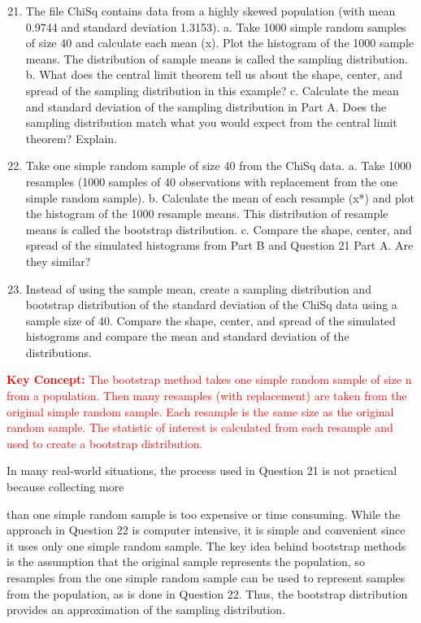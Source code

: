 \documentclass[
]{report}
\theoremstyle{definition}
\theoremstyle{definition}
\theoremstyle{definition}
\theoremstyle{definition}
\theoremstyle{remark}
\begin{document}
\begin{enumerate}
  \setcounter{enumi}{20} 
\item The file ChiSq contains data from a highly skewed population (with mean 0.9744 and standard
deviation 1.3153).
a. Take 1000 simple random samples of size 40 and calculate each mean (x). Plot the histogram of the
1000 sample means. The distribution of sample means is called the sampling distribution.
b. What does the central limit theorem tell us about the shape, center, and spread of the sampling distribution
in this example?
c. Calculate the mean and standard deviation of the sampling distribution in Part A. Does the sampling
distribution match what you would expect from the central limit theorem? Explain.
\item Take one simple random sample of size 40 from the ChiSq data.
a. Take 1000 resamples (1000 samples of 40 observations with replacement from the one simple
random sample).
b. Calculate the mean of each resample (x*) and plot the histogram of the 1000 resample means. This
distribution of resample means is called the bootstrap distribution.
c. Compare the shape, center, and spread of the simulated histograms from Part B and Question
21 Part A. Are they similar?
\item Instead of using the sample mean, create a sampling distribution and bootstrap distribution of the standard
deviation of the ChiSq data using a sample size of 40. Compare the shape, center, and spread of
the simulated histograms and compare the mean and standard deviation of the distributions.
\end{enumerate}

\Large

\textbf{\textcolor{red}{Key Concept:}}
\textcolor{red}{The bootstrap method takes one simple random sample of size n from a population. Then many resamples
(with replacement) are taken from the original simple random sample. Each resample is the same
size as the original random sample. The statistic of interest is calculated from each resample and used
to create a bootstrap distribution.}

\normalsize

In many real-world situations, the process used in Question 21 is not practical because collecting more

than one simple random sample is too expensive or time consuming. While the approach in Question 22 is
computer intensive, it is simple and convenient since it uses only one simple random sample. The key idea
behind bootstrap methods is the assumption that the original sample represents the population, so resamples
from the one simple random sample can be used to represent samples from the population, as is done in Question
22. Thus, the bootstrap distribution provides an approximation of the sampling distribution.
\end{document}
